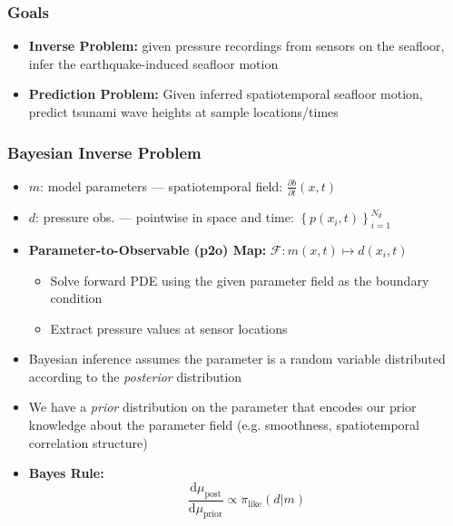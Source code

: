 \begin{frame}
    \frametitle{Goals}
    \begin{itemize}
        \item \textbf{Inverse Problem:} given pressure recordings from sensors on the seafloor, infer the earthquake-induced seafloor motion
        \item \textbf{Prediction Problem:} Given inferred spatiotemporal seafloor motion, predict tsunami wave heights at sample locations/times
    \end{itemize}
\end{frame}

\begin{frame}
    \frametitle{Bayesian Inverse Problem}
    \begin{itemize}
        \item \(m\): model parameters — spatiotemporal field: \(\frac{\partial b}{\partial t}(x,t)\)
        \item \(d\): pressure obs. — pointwise in space and time: \(\left\{p(x_i, t)\right\}_{i=1}^{N_d}\)
        \item \textbf{Parameter-to-Observable (p2o) Map:} \(\mathcal{F}: m(x,t) \mapsto d(x_i,t)\)
        \begin{itemize}
            \item Solve forward PDE using the given parameter field as the boundary condition
            \item Extract pressure values at sensor locations
        \end{itemize}
        \item Bayesian inference assumes the parameter is a random variable distributed according to the \emph{posterior} distribution
        \item We have a \emph{prior} distribution on the parameter that encodes our prior knowledge about the parameter field (e.g. smoothness, spatiotemporal correlation structure)
        \item \textbf{Bayes Rule:}
        \[
        \frac{\text{d}\mu_{\text{post}}}{\text{d}\mu_{\text{prior}}} \propto \pi_{\text{like}}(d|m)
        \]
    \end{itemize}
\end{frame}

